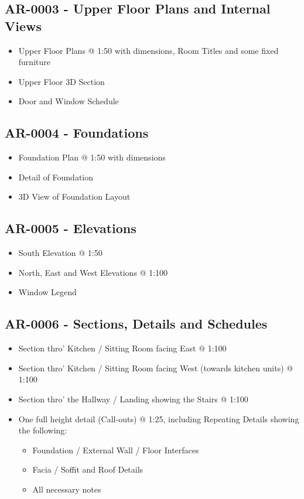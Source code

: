 \subsection*{AR-0003 - Upper Floor Plans and Internal Views}
\begin{itemize}
	\item Upper Floor Plans @ 1:50 with dimensions, Room Titles and some fixed furniture
	\item Upper Floor 3D Section
	\item Door and Window Schedule
\end{itemize}


\subsection*{AR-0004 - Foundations}
\begin{itemize}
	\item Foundation Plan @ 1:50 with dimensions
	\item Detail of Foundation
	\item 3D View of Foundation Layout
\end{itemize}



\subsection*{AR-0005 - Elevations}
\begin{itemize}
	\item South Elevation @ 1:50
	\item North, East and West Elevations @ 1:100
	\item Window Legend
\end{itemize}

\subsection*{AR-0006 - Sections, Details and Schedules}
\begin{itemize}
	\item Section thro' Kitchen / Sitting Room facing East @ 1:100
	\item Section thro' Kitchen / Sitting Room facing West (towards kitchen units) @ 1:100
	\item Section thro' the Hallway / Landing showing the Stairs @ 1:100
	\item One full height detail (Call-outs) @ 1:25, including Repeating Details showing the following:
	\begin{itemize}
		\item Foundation / External Wall / Floor Interfaces
		\item Facia / Soffit and Roof Details
		\item All necessary notes
	\end{itemize} 
\end{itemize}

